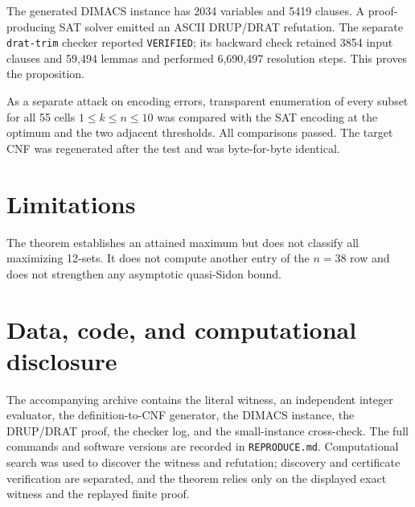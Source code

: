 \documentclass[11pt]{amsart}
\theoremstyle{definition}
\begin{document}
The generated DIMACS instance has 2034 variables and 5419 clauses.  A
proof-producing SAT solver emitted an ASCII DRUP/DRAT refutation.  The
separate \texttt{drat-trim} checker \cite{WetzlerHeuleHunt2014} reported
\texttt{VERIFIED}; its backward check retained 3854 input clauses and 59,494
lemmas and performed 6,690,497 resolution steps.  This proves the proposition.

As a separate attack on encoding errors, transparent enumeration of every
subset for all 55 cells \(1\le k\le n\le10\) was compared with the SAT encoding
at the optimum and the two adjacent thresholds.  All comparisons passed.  The
target CNF was regenerated after the test and was byte-for-byte identical.

\section{Limitations}

The theorem establishes an attained maximum but does not classify all
maximizing 12-sets.  It does not compute another entry of the \(n=38\) row and
does not strengthen any asymptotic quasi-Sidon bound.

\section*{Data, code, and computational disclosure}

The accompanying archive contains the literal witness, an independent integer
evaluator, the definition-to-CNF generator, the DIMACS instance, the DRUP/DRAT
proof, the checker log, and the small-instance cross-check.  The full commands
and software versions are recorded in \texttt{REPRODUCE.md}.  Computational
search was used to discover the witness and refutation; discovery and
certificate verification are separated, and the theorem relies only on the
displayed exact witness and the replayed finite proof.



\end{document}
